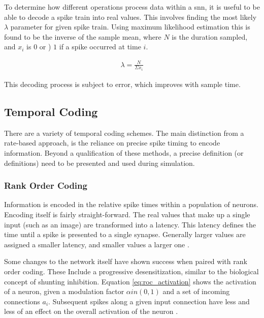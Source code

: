     
    
    To determine how different operations process data within a \Gls{snn}, it is
    useful to be able to decode a spike train into real values. This involves
    finding the most likely $\lambda$ parameter for given spike train. Using
    maximum likelihood estimation this is found to be the inverse of the sample
    mean, where $N$ is the duration sampled, and $x_i$ is $0$ or ) $1$ if a
    spike occurred at time $i$.
    
    \begin{align}
        \lambda = \frac{N}{\Sigma x_i}
    \end{align}
    
    This decoding process is subject to error, which improves with sample
    time.
    
    \subsection{Temporal Coding}
    There are a variety of temporal coding schemes. The main distinction from a
    rate-based approach, is the reliance on precise spike timing to encode
    information. Beyond a qualification of these methods, a precise definition
    (or definitions) need to be presented and used during simulation.
    
    \subsubsection{Rank Order Coding}
    Information is encoded in the relative spike times within a population of
    neurons. Encoding itself is fairly straight-forward. The real values that
    make up a single input (such as an image) are transformed into a
    latency. This latency defines the time until a spike is presented to a
    single synapse. Generally larger values are assigned a smaller latency, and
    smaller values a larger one \cite{delorme_2001}.
    
    Some changes to the network itself have shown success when paired with rank
    order coding. These Include a progressive desensitization, similar to the
    biological concept of shunting inhibition. Equation \ref{eq:roc_activation}
    shows the activation of a neuron, given a modulation factor
    $\alpha in (0,1)$ and a set of incoming connections $a_i$. Subsequent spikes along a
    given input connection have less and less of an effect on the overall
    activation of the neuron \cite{delorme_2001}.
    

